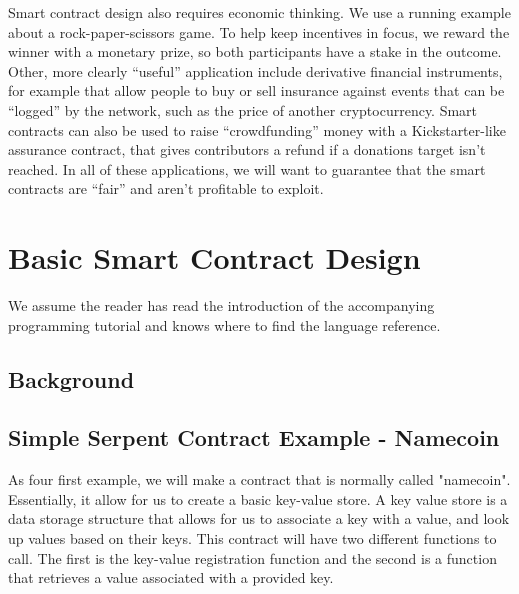 \documentclass[10pt,twocolumn,letterpaper]{article}
\begin{document}
Smart contract design also requires economic thinking. We use a running example about a rock-paper-scissors game. To help keep incentives in focus, we reward the winner with a monetary prize, so both participants have a stake in the outcome.  Other, more clearly “useful” application include derivative financial instruments, for example that allow people to buy or sell insurance against events that can be “logged” by the network, such as the price of another cryptocurrency. Smart contracts can also be used to raise “crowdfunding” money with a Kickstarter-like assurance contract, that gives contributors a refund if a donations target isn’t reached. In all of these applications, we will want to guarantee that the smart contracts are ``fair'' and aren't profitable to exploit.




\section{Basic Smart Contract Design}

We assume the reader has read the introduction of the accompanying programming tutorial and knows where to find the language reference.

\subsection{Background}

\subsection{Simple Serpent Contract Example - Namecoin}
As four first example, we will make a contract that is normally called "namecoin". Essentially, it allow for us to create a basic key-value store. A key value store is a data storage structure that allows for us to associate a key with a value, and look up values based on their keys. This contract will have two different functions to call. The first is the key-value registration function and the second is a function that retrieves a value associated with a provided key.
\end{document}
